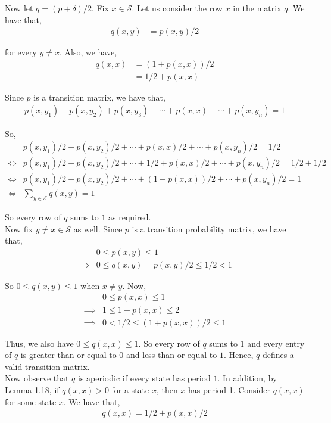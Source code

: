 \documentclass[12pt]{article}
\begin{document}
Now let $q = (p + \delta)/2$. Fix $x \in \mathcal{S}$. Let us consider the row $x$ in the matrix $q$. We have that,
\begin{align*}
q(x, y) &= p(x,y)/2
\end{align*}

for every $y \neq x$. Also, we have,
\begin{align*}
q(x, x) &= (1 + p(x, x))/2\\
&= 1/2 + p(x, x)
\end{align*}

Since $p$ is a transition matrix, we have that,
\begin{align*}
p(x, y_1) + p(x, y_2) + p(x, y_3) + \cdots + p(x, x) + \cdots + p(x, y_n) = 1
\end{align*}

So,
\begin{align*}
&p(x, y_1)/2 + p(x, y_2)/2 + \cdots + p(x, x)/2 + \cdots + p(x, y_n)/2 = 1/2\\
\iff &p(x, y_1)/2 + p(x, y_2)/2 + \cdots + 1/2 + p(x, x)/2 + \cdots + p(x, y_n)/2 = 1/2 + 1/2\\
\iff &p(x, y_1)/2 + p(x, y_2)/2 + \cdots + (1 + p(x, x))/2 + \cdots + p(x, y_n)/2 = 1\\
\iff &\sum_{y \in \mathcal{S}} q(x,y) = 1
\end{align*}

So every row of $q$ sums to $1$ as required.\\

Now fix $y \neq x \in \mathcal{S}$ as well. Since $p$ is a transition probability matrix, we have that,
\begin{align*}
&0 \leq p(x, y) \leq 1\\
\implies &0 \leq q(x,y) = p(x,y)/2 \leq 1/2 < 1
\end{align*}

So $0 \leq q(x,y) \leq 1$ when $x \neq y$. Now,
\begin{align*}
&0 \leq p(x, x) \leq 1\\
\implies &1 \leq 1 + p(x, x) \leq 2\\
\implies &0 < 1/2 \leq (1 + p(x,x))/2 \leq 1
\end{align*}

Thus, we also have $0 \leq q(x, x) \leq 1$. So every row of $q$ sums to $1$ and every entry of $q$ is greater than or equal to $0$ and less than or equal to $1$. Hence, $q$ defines a valid transition matrix.\\

Now observe that $q$ is aperiodic if every state has period $1$. In addition, by Lemma 1.18, if $q(x, x) > 0$ for a state $x$, then $x$ has period 1. Consider $q(x,x)$ for some state $x$. We have that,
\begin{align*}
q(x,x) = 1/2 + p(x,x)/2
\end{align*}
\end{document}
